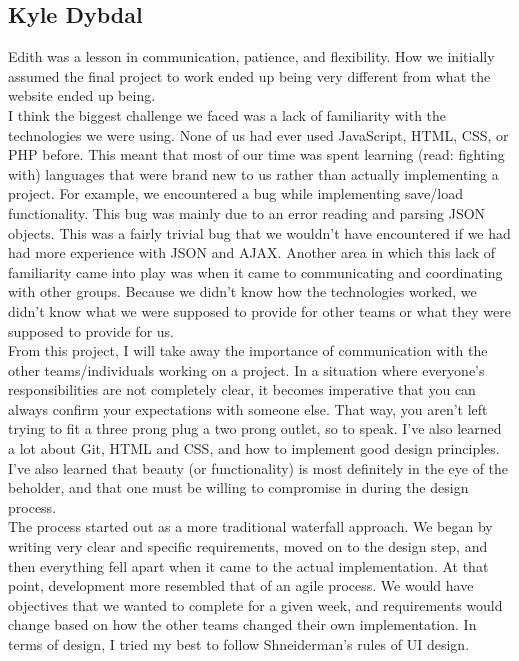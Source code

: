 \documentclass[12pt]{article}
\begin{document}
\subsection{Kyle Dybdal}

Edith was a lesson in communication, patience, and flexibility. How we initially assumed the final project to work ended up being very different from what the website ended up being. \\

I think the biggest challenge we faced was a lack of familiarity with the technologies we were using. None of us had ever used JavaScript, HTML, CSS, or PHP before. This meant that most of our time was spent learning (read: fighting with) languages that were brand new to us rather than actually implementing a project. For example, we encountered a bug while implementing save/load functionality. This bug was mainly due to an error reading and parsing JSON objects. This was a fairly trivial bug that we wouldn't have encountered if we had had more experience with JSON and AJAX. Another area in which this lack of familiarity came into play was when it came to communicating and coordinating with other groups. Because we didn't know how the technologies worked, we didn't know what we were supposed to provide for other teams or what they were supposed to provide for us.\\

From this project, I will take away the importance of communication with the other teams/individuals working on a project. In a situation where everyone's responsibilities are not completely clear, it becomes imperative that you can always confirm your expectations with someone else. That way, you aren't left trying to fit a three prong plug a two prong outlet, so to speak. I've also learned a lot about Git, HTML and CSS, and how to implement good design principles. I've also learned that beauty (or functionality) is most definitely in the eye of the beholder, and that one must be willing to compromise in during the design process.\\

The process started out as a more traditional waterfall approach. We began by writing very clear and specific requirements, moved on to the design step, and then everything fell apart when it came to the actual implementation. At that point, development more resembled that of an agile process. We would have objectives that we wanted to complete for a given week, and requirements would change based on how the other teams changed their own implementation. In terms of design, I tried my best to follow Shneiderman's rules of UI design.\\
\end{document}
